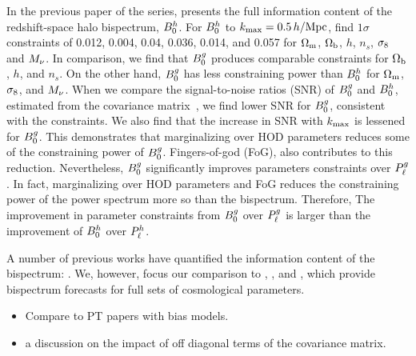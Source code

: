 In the previous paper of the series, \cite{hahn2020} presents the full
information content of the redshift-space halo bispectrum, $B^h_0$. For $B^h_0$ to
$k_{\rm max}=0.5\,h/\mathrm{Mpc}$, \cite{hahn2020} find $1\sigma$ constraints of 0.012, 0.004,
0.04, 0.036, 0.014, and 0.057 for $\Omega_{\rm m}$, $\Omega_{\rm b}$, $h$, $n_s$, $\sigma_8$ and $M_\nu$. 
In comparison, we find that $B^g_0$ produces comparable constraints for $\Omega_{\rm b}$, 
$h$, and $n_s$. On the other hand, $B^g_0$ has less constraining power than 
$B^h_0$ for $\Omega_{\rm m}$, $\sigma_8$, and $M_\nu$. When we compare the signal-to-noise
ratios (SNR) of $B^g_0$ and $B^h_0$, estimated from the covariance
matrix~\citep[\eg][]{sefusatti2005,sefusatti2006,chan2017}, we find lower SNR
for $B^g_0$, consistent with the constraints. We also find that the increase in
SNR with $k_{\rm max}$ is lessened for $B^g_0$. This demonstrates that marginalizing
over HOD parameters reduces some of the constraining power of $B^g_0$.
Fingers-of-god (FoG), also contributes to this reduction. 
Nevertheless, $B^g_0$ significantly improves parameters constraints over $P^g_{\ell}$.
In fact, marginalizing over HOD parameters and FoG reduces the constraining
power of the power spectrum more so than the bispectrum. Therefore,  
The improvement in parameter constraints from $B^g_0$ over $P^g_{\ell}$ is larger than
the improvement of $B^h_0$ over $P^h_{\ell}$.

A number of previous works have quantified the information content of the
bispectrum: \cite{scoccimarro2004, reischke2019}.
We, however, focus our comparison to \cite{sefusatti2006}, \cite{yankelevich2019}, and
\cite{chudaykin2019}, which provide bispectrum forecasts for full sets of
cosmological parameters.

\begin{itemize}
    \item Compare to PT papers with bias models. 
    \item a discussion on the impact of off diagonal terms of the covariance matrix. 
\end{itemize} 

